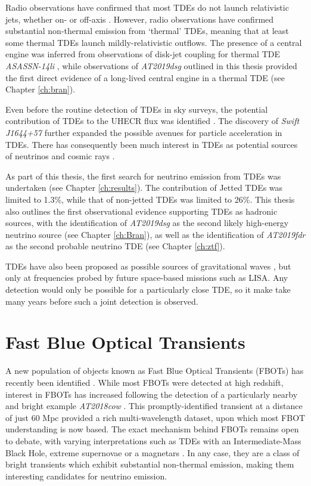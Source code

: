 Radio observations have confirmed that most TDEs do not launch relativistic jets, whether on- or off-axis . However, radio observations have confirmed substantial non-thermal emission from `thermal' TDEs, meaning that at least some thermal TDEs launch mildly-relativistic outflows. The presence of a central engine was inferred from observations of disk-jet coupling for thermal TDE \emph{ASASSN-14li} , while observations of \emph{AT2019dsg} outlined in this thesis provided the first direct evidence of a long-lived central engine in a thermal TDE (see Chapter \ref{ch:bran}).

Even before the routine detection of TDEs in sky surveys, the potential contribution of TDEs to the UHECR flux was identified . The discovery of \emph{Swift J1644+57} further expanded the possible avenues for particle acceleration in TDEs. There has consequently been much interest in TDEs as potential sources of neutrinos and cosmic rays . 

As part of this thesis, the first search for neutrino emission from TDEs was undertaken (see Chapter \ref{ch:results}). The contribution of Jetted TDEs was limited to 1.3\%, while that of non-jetted TDEs was limited to 26\%.  This thesis also outlines the first observational evidence supporting TDEs as hadronic sources, with the identification of \emph{AT2019dsg} as the second likely high-energy neutrino source (see Chapter \ref{ch:Bran}), as well as the identification of \emph{AT2019fdr} as the second probable neutrino TDE (see Chapter \ref{ch:ztf}).

TDEs have also been proposed as possible sources of gravitational waves , but only at frequencies probed by future space-based missions such as LISA. Any detection would only be possible for a particularly close TDE, so it make take many years before such a joint detection is observed.

\section{Fast Blue Optical Transients}
\label{sec:fbot}

A new population of objects known as Fast Blue Optical Transients (FBOTs) has recently been identified . While most FBOTs were detected at high redshift, interest in FBOTs has increased following the detection of a particularly nearby and bright example \emph{AT2018cow} . This promptly-identified transient at a distance of just 60 Mpc provided a rich multi-wavelength dataset, upon which most FBOT understanding is now based. The exact mechanism behind FBOTs remains open to debate, with varying interpretations such as TDEs with an Intermediate-Mass Black Hole, extreme supernovae or a magnetars . In any case, they are a class of bright transients which exhibit substantial non-thermal emission, making them interesting candidates for neutrino emission.

